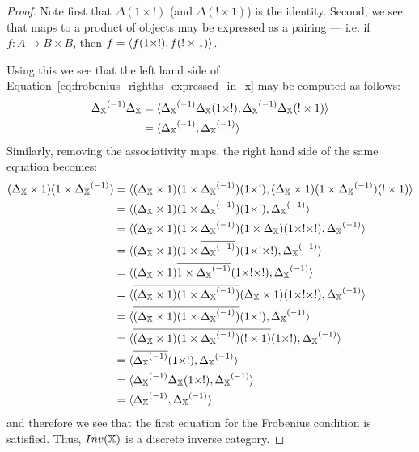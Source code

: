 \begin{proof}
  Note first that $\Delta(1 \times !)$ (and $\Delta(!\times 1)$) is the identity. Second, we see
  that maps to a product of objects may be expressed as a pairing --- i.e.  if
  $f:A \to B \times B$, then $f = \langle f(1\times !), f(!\times 1)\rangle$.

  Using this we see that the left hand side of Equation~\ref{eq:frobenius_righths_expressed_in_x}
  may be computed as follows:
  \begin{align*}
    {\Delta_{\ensuremath{\mathbb{X}}}}^{(-1)} \Delta_{\mathbb{X}}
      & = \langle{\Delta_{\ensuremath{\mathbb{X}}}}^{(-1)} \Delta_{\mathbb{X}}(1\times !), {\Delta_{\mathbb{X}}}^{(-1)} \Delta_{\mathbb{X}} (! \times 1)\rangle\\
    &= \langle{\Delta_{\ensuremath{\mathbb{X}}}}^{(-1)}, {\Delta_{\mathbb{X}}}^{(-1)} \rangle
  \end{align*}
  Similarly, removing the associativity maps, the right hand side of the same equation becomes:
  \begin{align*}
    (\Delta_{\X} \times 1) (1\times\inv{\Delta_{\X}}) &
      = \<(\Delta_{\X} \times 1) (1\times\inv{\Delta_{\X}}) (1\times !),
      (\Delta_{\X} \times 1) (1\times\inv{\Delta_{\X}}) (! \times 1 )\> \\
    &= \<(\Delta_{\X} \times 1) (1\times\inv{\Delta_{\X}}) (1\times ! ), \inv{\Delta_{\X}}\> \\
    &= \<(\Delta_{\X} \times 1) (1\times\inv{\Delta_{\X}}) (1 \times \Delta_{\X})(1\times !\times !), \inv{\Delta_{\X}}\> \\
    &= \<(\Delta_{\X} \times 1) (1\times\rst{\inv{\Delta_{\X}}}) (1\times !\times !), \inv{\Delta_{\X}}\> \\
    &= \<(\Delta_{\X} \times 1) \rst{1\times\inv{\Delta_{\X}}} (1\times !\times !), \inv{\Delta_{\X}}\> \\
    &= \<\rst{(\Delta_{\X} \times 1) (1\times\inv{\Delta_{\X}})}
      (\Delta_{\X} \times 1)(1\times !\times !), \inv{\Delta_{\X}}\> \\ %
    &= \<\rst{(\Delta_{\X} \times 1) (1\times\inv{\Delta_{\X}})} (1\times !), \inv{\Delta_{\X}}\> \\
      &= \<\rst{(\Delta_{\X} \times 1) (1\times\inv{\Delta_{\X}})(! \times 1)} (1\times !),
      \inv{\Delta_{\X}}\> \\ %
    &= \<\rst{\inv{\Delta_{\X}}} (1\times !), \inv{\Delta_{\X}}\> \\
    &= \<\inv{\Delta_{\X}}\Delta_{\X}(1\times !), \inv{\Delta_{\X}}\> \\
    &= \<\inv{\Delta_{\X}}, \inv{\Delta_{\X}}\>
  \end{align*}
  and therefore we see that the first equation for the Frobenius condition is satisfied. Thus,
  $Inv(\mathbb{X})$ is a discrete inverse category.
\end{proof}






